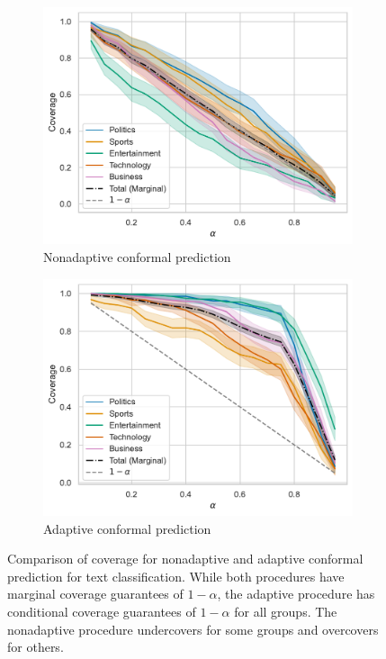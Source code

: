 \documentclass[a4paper, 12pt]{article}
\begin{document}
\begin{figure}[ht]
    \centering
    \begin{subfigure}[b]{0.8\linewidth}
        \includegraphics[width=\linewidth]{figures/nonadaptive_conditional_coverage.pdf}
        \caption{Nonadaptive conformal prediction}
        \label{fig:nonadaptive_coverage}
    \end{subfigure}
    \begin{subfigure}[b]{0.8\linewidth}
        \includegraphics[width=\linewidth]{figures/adaptive_conditional_coverage.pdf}
        \caption{Adaptive conformal prediction}
        \label{fig:adaptive_coverage}
    \end{subfigure}
    \caption{Comparison of coverage for nonadaptive and adaptive conformal prediction for text classification. While both procedures have marginal coverage guarantees of $1-\alpha$, the adaptive procedure has conditional coverage guarantees of $1-\alpha$ for all groups. The nonadaptive procedure undercovers for some groups and overcovers for others.}
    \label{fig:conformal_prediction}
\end{figure}
\end{document}
